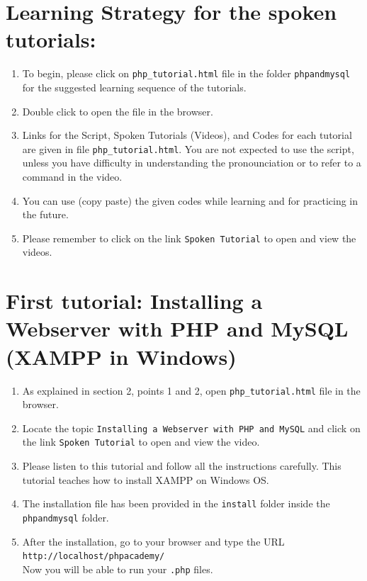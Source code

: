 \documentclass[11pt]{article}
\newenvironment{enumcpt}{\begin{enumerate} \topsep 0pt \partopsep 0pt 
                        \parsep 0pt
                        \itemsep 0pt \leftmargin -1in \rightmargin 0pt
                        }{\end{enumerate}}
\begin{document}
\begin{multicols}{2}
\section{Learning Strategy for the spoken tutorials:}
\begin{enumcpt}
\item To begin, please click on {\tt php\_tutorial.html} file in the folder {\tt phpandmysql} for the suggested learning sequence of the tutorials.  
\item Double click to open the file in the browser.  
\item Links for the Script, Spoken Tutorials (Videos), and Codes for each tutorial are given in file {\tt php\_tutorial.html}.  You are not expected to use the script, unless you have difficulty in understanding the pronounciation or to refer to a command in the video. 
\item You can use (copy paste) the given codes while learning and for practicing in the future. 
\item Please remember to click on the link {\tt Spoken Tutorial} to open and view the videos.
\end{enumcpt}

\section{First tutorial: Installing a Webserver with PHP and MySQL (XAMPP in Windows)}
\begin{enumcpt}
\item As explained in section 2, points 1 and 2, open {\tt php\_tutorial.html} file in the browser.
\item Locate the topic {\tt Installing a Webserver with PHP and MySQL} and click on the link {\tt Spoken Tutorial} to open and view the video.
\item Please listen to this tutorial and follow all the instructions carefully.  This tutorial teaches how to install XAMPP on Windows OS.
\item The installation file has been provided in the {\tt install} folder inside the {\tt phpandmysql} folder.
\item After the installation, go to your browser and type the URL \\
 {\tt http://localhost/phpacademy/}\\
Now you will be able to run your {\tt .php} files.
\end{enumcpt}


\end{multicols}
\end{document}
